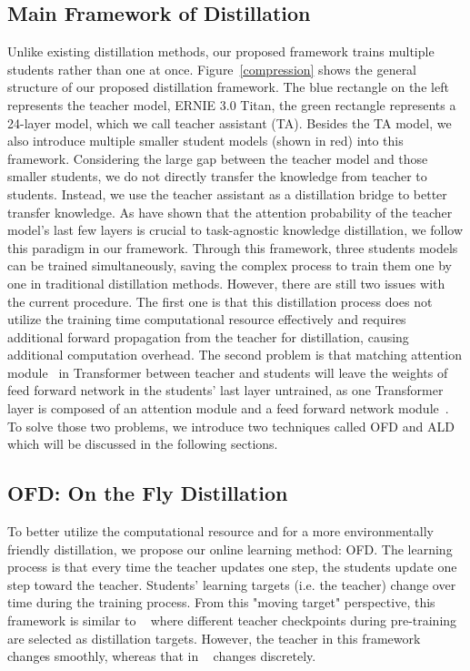 \subsection{Main Framework of Distillation} Unlike existing distillation methods, our proposed framework trains multiple students rather than one at once. Figure~\ref{compression} shows the general structure of our proposed distillation framework. The blue rectangle on the left represents the teacher model, ERNIE 3.0 Titan, the green rectangle represents a 24-layer model, which we call teacher assistant (TA). Besides the TA model, we also introduce multiple smaller student models (shown in red) into this framework. Considering the large gap between the teacher model and those smaller students, we do not directly transfer the knowledge from teacher to students. Instead, we use the teacher assistant \cite{teacher-assistant} as a distillation bridge to better transfer knowledge. As \cite{minilm,minilmv2} have shown that the attention probability of the teacher model's last few layers is crucial to task-agnostic knowledge distillation, we follow this paradigm in our framework. Through this framework, three students models can be trained simultaneously, saving the complex process to train them one by one in traditional distillation methods. However, there are still two issues with the current procedure. The first one is that this distillation process does not utilize the training time computational resource effectively and requires additional forward propagation from the teacher for distillation, causing additional computation overhead. The second problem is that matching attention module~\cite{minilm,minilmv2} in Transformer between teacher and students will leave the weights of feed forward network in the students' last layer untrained, as one Transformer layer is composed of an attention module and a feed forward network module~\cite{vaswani2017attention}. To solve those two problems, we introduce two techniques called OFD and ALD which will be discussed in the following sections.

\subsection{OFD: On the Fly Distillation} \label{sec:OFS}
To better utilize the computational resource and for a more environmentally friendly distillation, we propose our online learning method: OFD. The learning process is that every time the teacher updates one step, the students update one step toward the teacher. Students' learning targets (i.e. the teacher) change over time during the training process. From this "moving target" perspective, this framework is similar to ~\cite{rco} where different teacher checkpoints during pre-training are selected as distillation targets. However, the teacher in this framework changes smoothly, whereas that in ~\cite{rco} changes discretely. 


